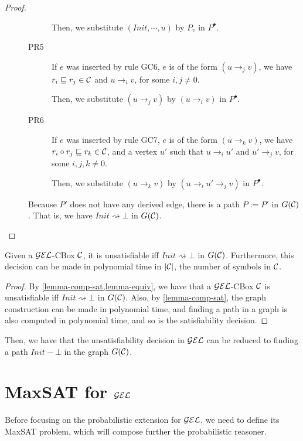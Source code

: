 \begin{proof}
\begin{description}
\begin{description}
        Then, we substitute $(Init, \cdots, u)$ by $P_v$ in $P^\bullet$.
        
        \item[PR5] If $e$ was inserted by rule GC6, $e$ is of the form $(u \to_j v)$, we have $r_i \sqsubseteq r_j \in \mathcal{C}$ and $u \to_i v$, for some $i,j \neq 0$.
        
        Then, we substitute $(u \to_j v)$ by $(u \to_i v)$ in $P^\bullet$.
        
        \item[PR6] If $e$ was inserted by rule GC7, $e$ is of the form $(u \to_k v)$, we have $r_i \circ r_j \sqsubseteq r_k \in \mathcal{C}$, and a vertex $u'$ such that $u \to_i u'$ and $u' \to_j v$, for some $i,j,k \neq 0$.
        
        Then, we substitute $(u \to_k v)$ by $(u \to_i u' \to_j v)$ in $P^\bullet$.
    \end{description}
    Because $P'$ does not have any derived edge, there is a path $P := P'$ in $G(\mathcal{C})$. That is, we have $Init \rightsquigarrow \bot$ in $G(\mathcal{C})$.
\end{description}
\end{proof}

\begin{theorem}
	\label{theorem:gel-sat}
Given a $\mathcal{GEL}$-CBox $\mathcal{C}$, it is unsatisfiable iff $Init \rightsquigarrow \bot$ in $G(\mathcal{C})$. Furthermore, this decision can be made in polynomial time in $|\mathcal{C}|$, the number of symbols in $\mathcal{C}$.
\end{theorem}
\begin{proof}
    By \cref{lemma-comp-sat,lemma-equiv}, we have that a $\mathcal{GEL}$-CBox $\mathcal{C}$ is unsatisfiable iff $Init \rightsquigarrow \bot$ in $G(\mathcal{C})$. Also, by \cref{lemma-comp-sat}, the graph construction can be made in polynomial time, and finding a path in a graph is also computed in polynomial time, and so is the satisfiability decision. 
\end{proof}

Then, we have that the unsatisfiability decision in $\mathcal{GEL}$ can be reduced to finding a path $Init-\bot$ in the graph $G(\mathcal{C})$.

\section{MaxSAT for \texorpdfstring{$\mathcal{GEL}$}{GEL}}
\label{sec:maxgel}

Before focusing on the probabilistic extension for $\mathcal{GEL}$, we need to define its MaxSAT problem, which will compose further the probabilistic reasoner.

